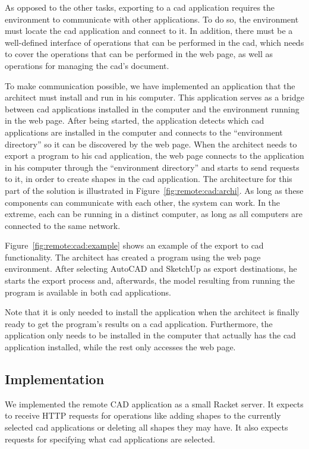 As opposed to the other tasks, exporting to a \gls{cad} application requires the environment to communicate with other applications.
To do so, the environment must locate the \gls{cad} application and connect to it.
In addition, there must be a well-defined interface of operations that can be performed in the \gls{cad}, which needs to cover the operations that can be performed in the web page, as well as operations for managing the \gls{cad}'s document.

To make communication possible, we have implemented an application that the architect must install and run in his computer.
This application serves as a bridge between \gls{cad} applications installed in the computer and the environment running in the web page.
After being started, the application detects which \gls{cad} applications are installed in the computer and connects to the ``environment directory'' so it can be discovered by the web page.
When the architect needs to export a program to his \gls{cad} application, the web page connects to the application in his computer through the ``environment directory'' and starts to send requests to it, in order to create shapes in the \gls{cad} application.
The architecture for this part of the solution is illustrated in Figure~\ref{fig:remote:cad:archi}.
As long as these components can communicate with each other, the system can work.
In the extreme, each can be running in a distinct computer, as long as all computers are connected to the same network.

Figure~\ref{fig:remote:cad:example} shows an example of the export to \gls{cad} functionality.
The architect has created a program using the web page environment.
After selecting AutoCAD and SketchUp as export destinations, he starts the export process and, afterwards, the model resulting from running the program is available in both \gls{cad} applications.

Note that it is only needed to install the application when the architect is finally ready to get the program's results on a \gls{cad} application.
Furthermore, the application only needs to be installed in the computer that actually has the \gls{cad} application installed, while the rest only accesses the web page.


\subsection{Implementation}
We implemented the remote CAD application as a small Racket server.
It expects to receive HTTP requests for operations like adding shapes to the currently selected \gls{cad} applications or deleting all shapes they may have.
It also expects requests for specifying what \gls{cad} applications are selected.

